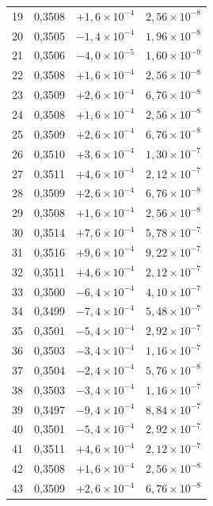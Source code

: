\documentclass[12pt,a4paper]{article}
\begin{document}
\begin{longtable}{cccc}
19 & 0,3508 & $+1{,}6\times10^{-4}$  & $2{,}56\times10^{-8}$ \\
20 & 0,3505 & $-1{,}4\times10^{-4}$  & $1{,}96\times10^{-8}$ \\
21 & 0,3506 & $-4{,}0\times10^{-5}$  & $1{,}60\times10^{-9}$ \\
22 & 0,3508 & $+1{,}6\times10^{-4}$  & $2{,}56\times10^{-8}$ \\
23 & 0,3509 & $+2{,}6\times10^{-4}$  & $6{,}76\times10^{-8}$ \\
24 & 0,3508 & $+1{,}6\times10^{-4}$  & $2{,}56\times10^{-8}$ \\
25 & 0,3509 & $+2{,}6\times10^{-4}$  & $6{,}76\times10^{-8}$ \\
26 & 0,3510 & $+3{,}6\times10^{-4}$  & $1{,}30\times10^{-7}$ \\
27 & 0,3511 & $+4{,}6\times10^{-4}$  & $2{,}12\times10^{-7}$ \\
28 & 0,3509 & $+2{,}6\times10^{-4}$  & $6{,}76\times10^{-8}$ \\
29 & 0,3508 & $+1{,}6\times10^{-4}$  & $2{,}56\times10^{-8}$ \\
30 & 0,3514 & $+7{,}6\times10^{-4}$  & $5{,}78\times10^{-7}$ \\
31 & 0,3516 & $+9{,}6\times10^{-4}$  & $9{,}22\times10^{-7}$ \\
32 & 0,3511 & $+4{,}6\times10^{-4}$  & $2{,}12\times10^{-7}$ \\
33 & 0,3500 & $-6{,}4\times10^{-4}$  & $4{,}10\times10^{-7}$ \\
34 & 0,3499 & $-7{,}4\times10^{-4}$  & $5{,}48\times10^{-7}$ \\
35 & 0,3501 & $-5{,}4\times10^{-4}$  & $2{,}92\times10^{-7}$ \\
36 & 0,3503 & $-3{,}4\times10^{-4}$  & $1{,}16\times10^{-7}$ \\
37 & 0,3504 & $-2{,}4\times10^{-4}$  & $5{,}76\times10^{-8}$ \\
38 & 0,3503 & $-3{,}4\times10^{-4}$  & $1{,}16\times10^{-7}$ \\
39 & 0,3497 & $-9{,}4\times10^{-4}$  & $8{,}84\times10^{-7}$ \\
40 & 0,3501 & $-5{,}4\times10^{-4}$  & $2{,}92\times10^{-7}$ \\
41 & 0,3511 & $+4{,}6\times10^{-4}$  & $2{,}12\times10^{-7}$ \\
42 & 0,3508 & $+1{,}6\times10^{-4}$  & $2{,}56\times10^{-8}$ \\
43 & 0,3509 & $+2{,}6\times10^{-4}$  & $6{,}76\times10^{-8}$ \\

\end{longtable}
\end{document}
